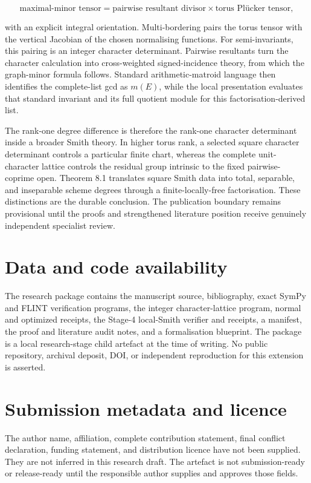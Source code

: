 \documentclass[
  11pt,
  a4paper,
]{article}
\begin{document}
\[
 \text{maximal-minor tensor}
 =\text{pairwise resultant divisor}
 \times\text{torus Plücker tensor},
\]

with an explicit integral orientation. Multi-bordering pairs the torus
tensor with the vertical Jacobian of the chosen normalising functions.
For semi-invariants, this pairing is an integer character determinant.
Pairwise resultants turn the character calculation into cross-weighted
signed-incidence theory, from which the graph-minor formula follows.
Standard arithmetic-matroid language then identifies the complete-list
gcd as \(m(E)\), while the local presentation evaluates that standard
invariant and its full quotient module for this factorisation-derived
list.

The rank-one degree difference is therefore the rank-one character
determinant inside a broader Smith theory. In higher torus rank, a
selected square character determinant controls a particular finite
chart, whereas the complete unit-character lattice controls the residual
group intrinsic to the fixed pairwise-coprime open. Theorem 8.1
translates square Smith data into total, separable, and inseparable
scheme degrees through a finite-locally-free factorisation. These
distinctions are the durable conclusion. The publication boundary
remains provisional until the proofs and strengthened literature
position receive genuinely independent specialist review.

\section{Data and code availability}\label{data-and-code-availability}

The research package contains the manuscript source, bibliography, exact
SymPy and FLINT verification programs, the integer character-lattice
program, normal and optimized receipts, the Stage-4 local-Smith verifier
and receipts, a manifest, the proof and literature audit notes, and a
formalisation blueprint. The package is a local research-stage child
artefact at the time of writing. No public repository, archival deposit,
DOI, or independent reproduction for this extension is asserted.

\section{Submission metadata and
licence}\label{submission-metadata-and-licence}

The author name, affiliation, complete contribution statement, final
conflict declaration, funding statement, and distribution licence have
not been supplied. They are not inferred in this research draft. The
artefact is not submission-ready or release-ready until the responsible
author supplies and approves those fields.
\end{document}
